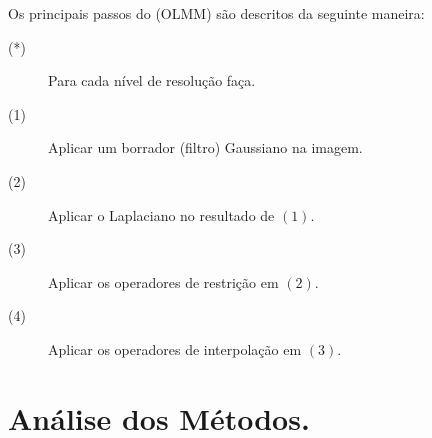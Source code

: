 \documentclass[a4paper]{article} %
\begin{document}
Os principais passos do (OLMM) são descritos da seguinte maneira:
\begin{description}
\item[(*)] Para cada nível de resolução faça.
\item[(1)] Aplicar um borrador (filtro) Gaussiano na imagem.
\item[(2)] Aplicar o Laplaciano  no resultado de $(1)$.
\item[(3)] Aplicar os operadores de restrição em $(2)$.
\item[(4)] Aplicar os operadores de interpolação em $(3)$.
\end{description}


\section{Análise dos Métodos.}
\end{document}

